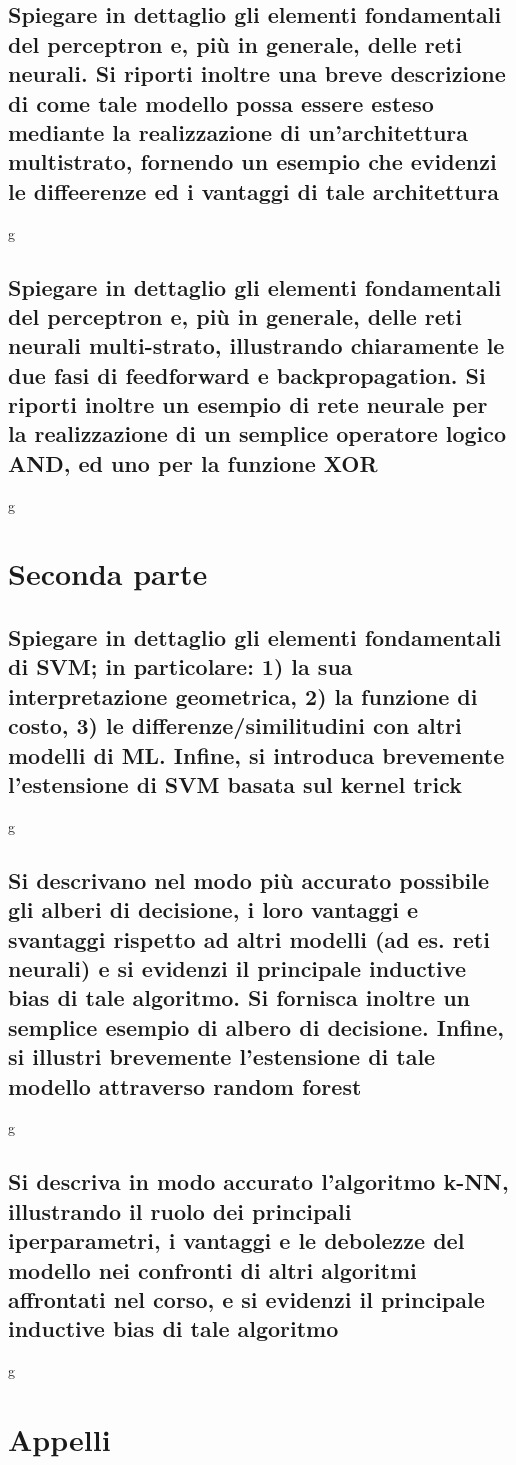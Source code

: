 \documentclass[10pt,oneside,a4paper]{article}
\begin{document}
\subsection{Spiegare in dettaglio gli elementi fondamentali del perceptron e, più in generale, delle reti
	neurali. Si riporti inoltre una breve descrizione di come tale modello possa essere esteso
	mediante la realizzazione di un’architettura multistrato, fornendo un esempio che evidenzi
	le diffeerenze ed i vantaggi di tale architettura}
g
\subsection{Spiegare in dettaglio gli elementi fondamentali del perceptron e, più in generale, delle reti
	neurali multi-strato, illustrando chiaramente le due fasi di feedforward e backpropagation.
	Si riporti inoltre un esempio di rete neurale per la realizzazione di un semplice operatore
	logico AND, ed uno per la funzione XOR}
g
\section{Seconda parte}
\subsection{Spiegare in dettaglio gli elementi fondamentali di SVM; in particolare: 1) la sua interpretazione geometrica, 2) la funzione di costo, 3) le differenze/similitudini con altri modelli di ML. Infine, si introduca brevemente l’estensione di SVM basata sul kernel trick}
g
\subsection{Si descrivano nel modo più accurato possibile gli alberi di decisione, i loro vantaggi e svantaggi rispetto ad altri modelli (ad es. reti neurali) e si evidenzi il principale inductive bias di tale algoritmo. Si fornisca inoltre un semplice esempio di albero di decisione. Infine, si illustri brevemente l’estensione di tale modello attraverso random forest}
g
\subsection{Si descriva in modo accurato l’algoritmo k-NN, illustrando il ruolo dei principali iperparametri, i vantaggi e le debolezze del modello nei confronti di altri algoritmi affrontati nel corso, e si evidenzi il principale inductive bias di tale algoritmo}
g
\section{Appelli}
\end{document}

